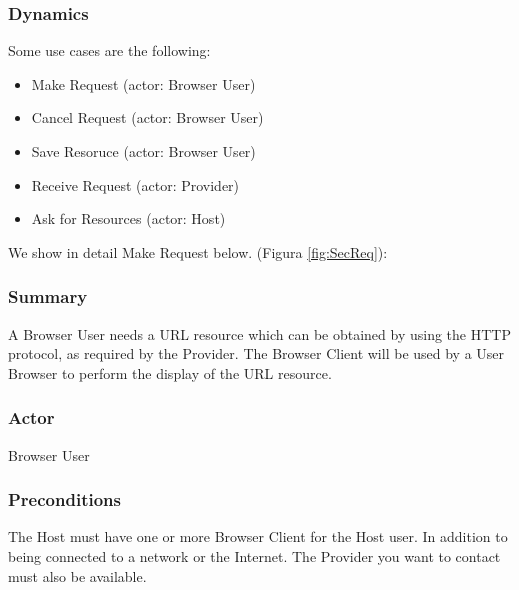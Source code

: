 \documentclass{sig-alternate-05-2015}
\begin{document}
    \subsubsection*{Dynamics}
    Some use cases are the following:
    \begin{itemize}
      \item Make Request (actor: Browser User)
      \item Cancel Request (actor: Browser User)
      \item Save Resoruce (actor: Browser User)
      \item Receive Request (actor: Provider)
      \item Ask for Resources (actor: Host)
    \end{itemize}
    We show in detail Make Request below. (Figura \ref{fig:SecReq}):
    \subsubsection*{Summary} A Browser User needs a URL resource which can be obtained by using the HTTP protocol, as required by the Provider. The Browser Client will be used by a User Browser to perform the display of the URL resource.
    \subsubsection*{Actor} Browser User
    \subsubsection*{Preconditions} The Host must have one or more Browser Client for the Host user. In addition to being connected to a network or the Internet. The Provider you want to contact must also be available.
\end{document}
